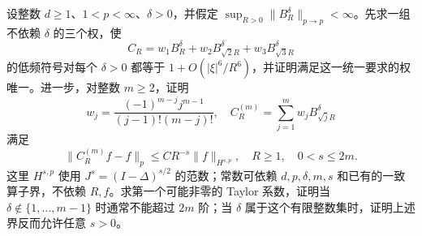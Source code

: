 \begin{exercise}\label{b2:ex:24-new-5}
设整数 \(d\geq1\)、\(1<p<\infty\)、\(\delta>0\)，并假定
\(\sup_{R>0}\|B_R^\delta\|_{p\to p}<\infty\)。先求一组不依赖 \(\delta\) 的三个权，使
\[
 C_R=w_1B_R^\delta+w_2B_{\sqrt2R}^\delta+w_3B_{\sqrt3R}^\delta
\]
的低频符号对每个 \(\delta>0\) 都等于 \(1+O(|\xi|^6/R^6)\)，并证明满足这一统一要求的权唯一。进一步，对整数 \(m\geq2\)，证明
\[
 w_j=\frac{(-1)^{m-j}j^{m-1}}{(j-1)!(m-j)!},
 \quad C_R^{(m)}=\sum_{j=1}^m w_j B_{\sqrt jR}^\delta
\]
满足
\[
 \|C_R^{(m)}f-f\|_p\leq C R^{-s}\|f\|_{H^{s,p}},
 \quad R\geq1,\quad0<s\leq2m.
\]
这里 \(H^{s,p}\) 使用 \(J^s=(I-\Delta)^{s/2}\) 的范数；常数可依赖 \(d,p,\delta,m,s\) 和已有的一致算子界，不依赖 \(R,f\)。求第一个可能非零的 Taylor 系数，证明当 \(\delta\notin\{1,\ldots,m-1\}\) 时通常不能超过 \(2m\) 阶；当 \(\delta\) 属于这个有限整数集时，证明上述界反而允许任意 \(s>0\)。
\end{exercise}
